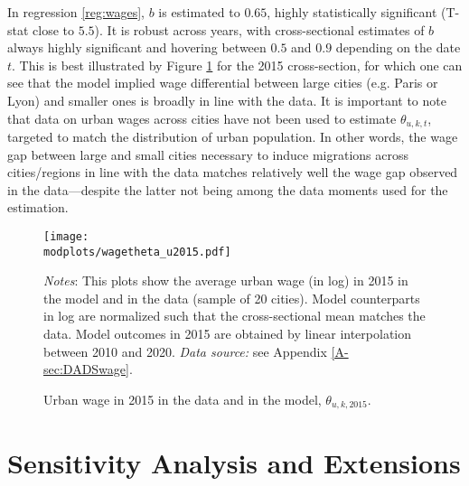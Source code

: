 \documentclass[11pt]{report}
\newcommand{\round}{revision3}  %
\newcommand{\modplots}{../../output/model/plots/\round}
\begin{document}
In regression \ref{reg:wages}, $b$ is estimated to $0.65$, highly statistically significant (T-stat close to $5.5$). It is robust across years, with cross-sectional estimates of $b$ always highly significant and hovering between $0.5$ and $0.9$ depending on the date $t$. This is best illustrated by Figure \ref{fig:wage} for the 2015 cross-section, for which one can see that the model implied wage differential between large cities (e.g. Paris or Lyon) and smaller ones is broadly in line with the data. It is important to note that data on urban wages across cities have not been used to estimate $\theta_{u,k,t}$, targeted to match the distribution of urban population. In other words, the wage gap between large and small cities necessary to induce migrations across cities/regions in line with the data matches relatively well the wage gap observed in the data---despite the latter not being among the data moments used for the estimation.

\begin{figure}[h!]
	\begin{adjustbox}{center}
		\texttt{[image: \\modplots/wagetheta\_u2015.pdf]}
	\end{adjustbox}
	\caption{Urban wage in 2015 in the data and in the model, $\theta_{u,k,2015}$.\label{fig:wage}}
	{\footnotesize \textit{Notes}: This plots show the average urban wage (in log) in 2015 in the model and in the data (sample of 20 cities). Model counterparts in log are normalized such that the cross-sectional mean matches the data. Model outcomes in 2015 are obtained by linear interpolation between 2010 and 2020. \textit{Data source:} see Appendix \ref{A-sec:DADSwage}.}\end{figure}

\newpage

\section{Sensitivity Analysis and Extensions}\label{B-sec:sensitivity}
\end{document}

